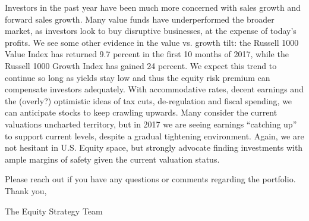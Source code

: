 \documentclass[11pt,pressrelease]{newlfm} %
\begin{document}
\begin{newlfm}
\begin{singlespace}
\begin{enumerate}
Investors in the past year have been much more concerned with sales growth and forward sales growth. Many value funds have underperformed the broader market, as investors look to buy disruptive businesses, at the expense of today's profits. We see some other evidence in the value vs. growth tilt: the Russell 1000 Value Index has returned 9.7 percent in the first 10 months of 2017, while the Russell 1000 Growth Index has gained 24 percent. We expect this trend to continue so long as yields stay low and thus the equity risk premium can compensate investors adequately. With accommodative rates, decent earnings and the (overly?) optimistic ideas of tax cuts, de-regulation and fiscal spending, we can anticipate stocks to keep crawling upwards. Many consider the current valuations uncharted territory, but in 2017 we are seeing earnings ``catching up'' to support current levels, despite a gradual tightening environment. Again, we are not hesitant in U.S. Equity space, but strongly advocate finding investments with ample margins of safety given the current valuation status.\\
\par
\begin{center}
\end{center}

\end{enumerate}
Please reach out if you have any questions or comments regarding the portfolio. Thank you, \par
The Equity Strategy Team


\end{singlespace} %



\end{newlfm}
\end{document}
